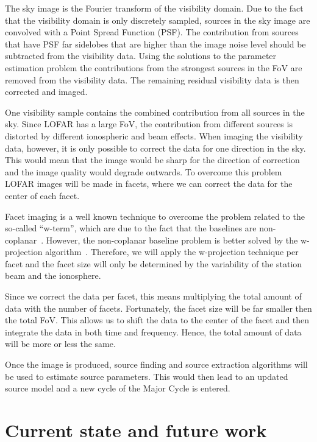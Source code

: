 \documentclass[journal]{IEEEtran}
\begin{document}
The sky image is the Fourier transform of the visibility domain. Due to the fact that the visibility domain is only discretely sampled, sources in the sky image are convolved with a Point Spread Function (PSF). The contribution from sources that have PSF far sidelobes that are higher than the image noise level should be subtracted from the visibility data. Using the solutions to the parameter estimation problem the contributions from the strongest sources in the FoV are removed from the visibility data. The remaining residual visibility data is then corrected and imaged.

One visibility sample contains the combined contribution from all sources in the sky. Since LOFAR has a large FoV, the contribution from different sources is distorted by different ionospheric and beam effects. When imaging the visibility data, however, it is only possible to correct the data for one direction in the sky. This would mean that the image would be sharp for the direction of correction and the image quality would degrade outwards. To overcome this problem LOFAR images will be made in facets, where we can correct the data for the center of each facet. 

Facet imaging is a well known technique to overcome the problem related to the so-called ``w-term'', which are due to the fact that the baselines are non-coplanar~\cite{SIRAII:99}. However, the non-coplanar baseline problem is better solved by the w-projection algorithm~\cite{Cornwell:05}. Therefore, we will apply the w-projection technique per facet and the facet size will only be determined by the variability of the station beam and the ionosphere.

Since we correct the data per facet, this means multiplying the total amount of data with the number of facets. Fortunately, the facet size will be far smaller then the total FoV. This allows us to shift the data to the center of the facet and then integrate the data in both time and frequency. Hence, the total amount of data will be more or less the same.
  
Once the image is produced, source finding and source extraction algorithms will be used to estimate source parameters. This would then lead to an updated source model and a new cycle of the Major Cycle is entered. 

\section{Current state and future work}
\end{document}
